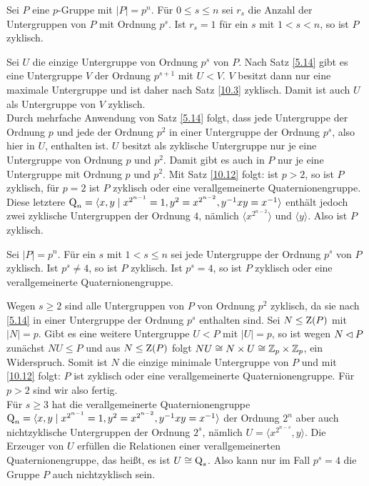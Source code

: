 \begin{satz}\label{10.14}
 Sei $P$ eine $p$-Gruppe mit $|P|=p^n$. F\"ur $0\leq s\leq n$ sei $r_s$ die Anzahl der Untergruppen von $P$ mit Ordnung $p^s$. Ist $r_s=1$ f\"ur ein $s$ mit $1<s<n$, so ist $P$ zyklisch.
\end{satz}
\begin{beweis}
Sei $U$ die einzige Untergruppe von Ordnung $p^s$ von $P$. Nach Satz \ref{5.14} gibt es eine Untergruppe $V$ der Ordnung $p^{s+1}$ mit $U<V$. $V$ besitzt dann nur eine maximale Untergruppe und ist daher nach Satz \ref{10.3} zyklisch. Damit ist auch $U$ als Untergruppe von $V$ zyklisch.\\
Durch mehrfache Anwendung von Satz \ref{5.14} folgt, dass jede Untergruppe der Ordnung $p$ und jede der Ordnung $p^2$ in einer Untergruppe der Ordnung $p^s$, also hier in $U$, enthalten ist. $U$ besitzt als zyklische Untergruppe nur je eine Untergruppe von Ordnung $p$ und $p^2$. Damit gibt es auch in $P$ nur je eine Untergruppe mit Ordnung $p$ und $p^2$. Mit Satz \ref{10.12} folgt: ist $p>2$, so ist $P$ zyklisch, f\"ur $p=2$ ist $P$ zyklisch oder eine verallgemeinerte Quaternionengruppe. Diese letztere $\operatorname{Q}_n=\langle x,y\mid x^{2^{n-1}}=1, y^2=x^{2^{n-2}}, y^{-1}xy=x^{-1}\rangle$ enth\"alt jedoch zwei zyklische Untergruppen der Ordnung $4$, n\"amlich $\langle x^{2^{n-2}}\rangle$ und $\langle y\rangle$. Also ist $P$ zyklisch.
 
\end{beweis}


\begin{satz}\label{10.15}
 Sei $|P|=p^n$. F\"ur ein $s$ mit $1<s\leq n$ sei jede Untergruppe der Ordnung $p^s$ von $P$ zyklisch. Ist $p^s\neq 4$, so ist $P$ zyklisch. Ist $p^s=4$, so ist $P$ zyklisch oder eine verallgemeinerte Quaternionengruppe.
\end{satz}

\begin{beweis}
Wegen $s\geq 2$ sind alle Untergruppen von $P$ von Ordnung $p^2$ zyklisch, da sie nach \ref{5.14} in einer Untergruppe der Ordnung $p^s$ enthalten sind. Sei $N\leq \operatorname{Z}(P)$ mit $|N|=p$. Gibt es eine weitere Untergruppe $U<P$ mit $|U|=p$, so ist wegen $N\lhd P$ zun\"achst $NU\leq P$ und aus $N\leq \operatorname{Z}(P)$ folgt $NU\cong N\times U\cong \mathbb{Z}_p\times \mathbb{Z}_p$, ein Widerspruch. Somit ist $N$ die einzige minimale Untergruppe von $P$ und mit \ref{10.12} folgt: $P$ ist zyklisch oder eine verallgemeinerte Quaternionengruppe. F\"ur $p>2$ sind wir also fertig.\\
F\"ur $s\geq 3$ hat die verallgemeinerte Quaternionengruppe $\operatorname{Q}_n=\langle x,y\mid x^{2^{n-1}}=1, y^2=x^{2^{n-2}}, y^{-1}xy=x^{-1}\rangle$ der Ordnung $2^n$ aber auch nichtzyklische Untergruppen der Ordnung $2^s$, n\"amlich $U=\langle x^{2^{n-s}}, y\rangle$. Die Erzeuger von $U$ erf\"ullen die Relationen einer verallgemeinerten Quaternionengruppe, das hei\ss{}t, es ist $U\cong \operatorname{Q}_s$. Also kann nur im Fall $p^s=4$ die Gruppe $P$ auch nichtzyklisch sein.
 
\end{beweis}

